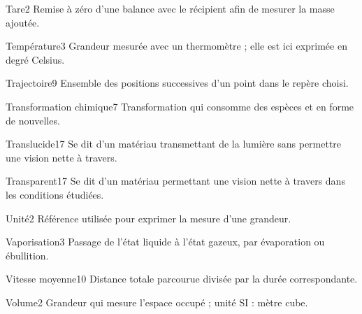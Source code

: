 \documentclass[12pt,twoside,openany]{book}
\begin{document}
\begin{pcLexique}{Tare}{2}
Remise à zéro d’une balance avec le récipient afin de mesurer la masse ajoutée.\par
\end{pcLexique}
\begin{pcLexique}{Température}{3}
Grandeur mesurée avec un thermomètre ; elle est ici exprimée en degré Celsius.\par
\end{pcLexique}
\begin{pcLexique}{Trajectoire}{9}
Ensemble des positions successives d’un point dans le repère choisi.\par
\end{pcLexique}
\begin{pcLexique}{Transformation chimique}{7}
Transformation qui consomme des espèces et en forme de nouvelles.\par
\end{pcLexique}
\begin{pcLexique}{Translucide}{17}
Se dit d’un matériau transmettant de la lumière sans permettre une vision nette à travers.\par
\end{pcLexique}
\begin{pcLexique}{Transparent}{17}
Se dit d’un matériau permettant une vision nette à travers dans les conditions étudiées.\par
\end{pcLexique}
\begin{pcLexique}{Unité}{2}
Référence utilisée pour exprimer la mesure d’une grandeur.\par
\end{pcLexique}
\begin{pcLexique}{Vaporisation}{3}
Passage de l’état liquide à l’état gazeux, par évaporation ou ébullition.\par
\end{pcLexique}
\begin{pcLexique}{Vitesse moyenne}{10}
Distance totale parcourue divisée par la durée correspondante.\par
\end{pcLexique}
\begin{pcLexique}{Volume}{2}
Grandeur qui mesure l’espace occupé ; unité SI : mètre cube.\par
\end{pcLexique}
\label{programme}
\end{document}
